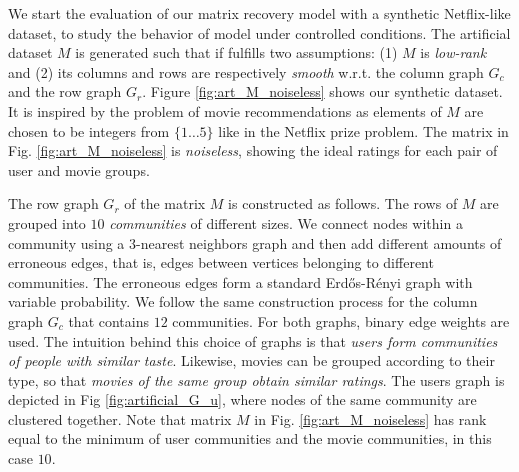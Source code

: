 \documentclass{article}
\begin{document}
We start the evaluation of our matrix recovery model with a synthetic Netflix-like dataset, to study the behavior of model under controlled conditions. 
The artificial dataset $M$ is generated such that if fulfills two assumptions: (1) $M$ is \textit{low-rank} and (2) its columns and rows are respectively \textit{smooth} w.r.t. the column graph $G_c$ and the row graph $G_r$. 
Figure \ref{fig:art_M_noiseless} shows our synthetic dataset. It is inspired by the problem of movie recommendations as elements of $M$ are chosen to be integers from $\{1\hdots 5\}$ like in the Netflix prize problem. The matrix in Fig. \ref{fig:art_M_noiseless} is \textit{noiseless}, showing the ideal ratings for each pair of user and movie groups.  



The row graph $G_r$ of the matrix $M$ is constructed as follows. The rows of $M$ are grouped into $10$ \textit{communities} of different sizes. We connect nodes within a community using a $3$-nearest neighbors graph and then add different amounts of erroneous edges, that is, edges between vertices belonging to different communities. The erroneous edges form a standard Erd\H{o}s-R\'{e}nyi graph with variable probability. We follow the same construction process for the column graph $G_c$ that contains $12$ communities. For both graphs, binary edge weights are used. The intuition behind this choice of graphs is that \textit{users form communities of people with similar taste}. Likewise, movies can be grouped according to their type, so that \textit{movies of the same group obtain similar ratings}. The users graph is depicted in Fig \ref{fig:artificial_G_u}, where nodes of the same community are clustered together. Note that matrix $M$ in Fig. \ref{fig:art_M_noiseless} has rank equal to the minimum of user communities and the movie communities, in this case $10$. 

\vspace{-0.1cm}
\end{document}

